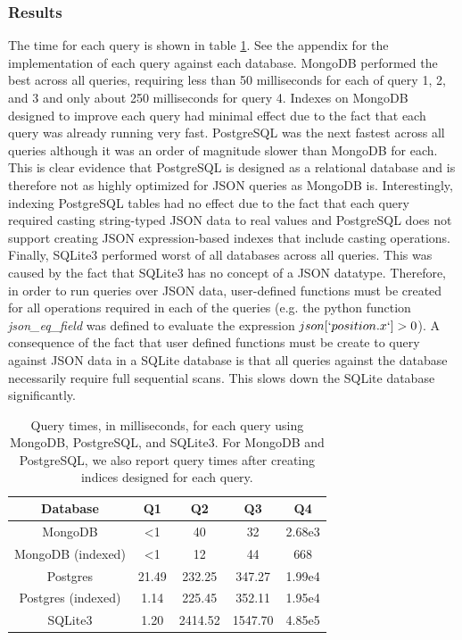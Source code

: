 \documentclass[nocopyrightspace]{acm_proc_article-sp}
\begin{document}
\subsubsection{Results}

The time for each query is shown in table \ref{tab:queries}. See the appendix for the implementation of each query against each database. MongoDB performed the best across all queries, requiring less than 50 milliseconds for each of query 1, 2, and 3 and only about 250 milliseconds for query 4. Indexes on MongoDB designed to improve each query had minimal effect due to the fact that each query was already running very fast. PostgreSQL was the next fastest across all queries although it was an order of magnitude slower than MongoDB for each. This is clear evidence that PostgreSQL is designed as a relational database and is therefore not as highly optimized for JSON queries as MongoDB is. Interestingly, indexing PostgreSQL tables had no effect due to the fact that each query required casting string-typed JSON data to real values and PostgreSQL does not support creating JSON expression-based indexes that include casting operations. Finally, SQLite3 performed worst of all databases across all queries. This was caused by the fact that SQLite3 has no concept of a JSON datatype. Therefore, in order to run queries over JSON data, user-defined functions must be created for all operations required in each of the queries (e.g. the python function \textit{json\_eq\_field} was defined to evaluate the expression $json[`position.x`] > 0$). A consequence of the fact that user defined functions must be create to query against JSON data in a SQLite database is that all queries against the database necessarily require full sequential scans. This slows down the SQLite database significantly.

\begin{table}
    \centering
    \begin{tabular}{c | c | c | c | c}
        Database           & Q1     & Q2      & Q3      & Q4     \\
        \hline
        MongoDB            & <1     & 40      & 32      & 2.68e3 \\
        MongoDB (indexed)  & <1     & 12      & 44      & 668    \\
        Postgres           & 21.49  & 232.25  & 347.27  & 1.99e4 \\
        Postgres (indexed) & 1.14   & 225.45  & 352.11  & 1.95e4 \\
        SQLite3            & 1.20   & 2414.52 & 1547.70 & 4.85e5 
    \end{tabular}
    \caption{Query times, in milliseconds, for each query using MongoDB, PostgreSQL, and SQLite3. For MongoDB and PostgreSQL, we also report query times after creating indices designed for each query.}
    \label{tab:queries}
\end{table}
\end{document}
